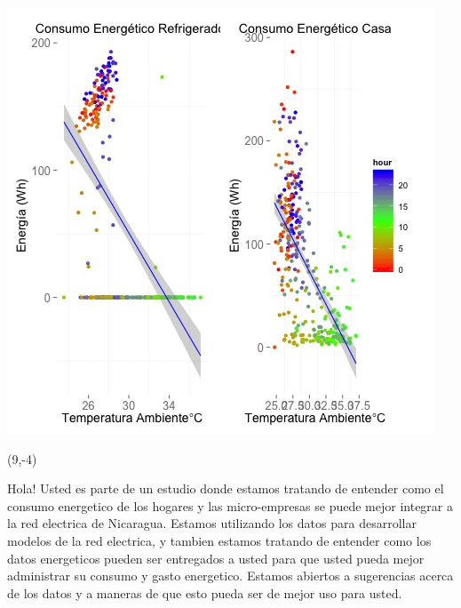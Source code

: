 \documentclass{article}\usepackage[]{graphicx}\usepackage[]{color}
\newenvironment{knitrout}{}{} %
\begin{document}
\begin{knitrout}
\color{fgcolor}
\includegraphics[scale=0.75]{figure/A12_correlaciones} 
\end{knitrout}

 \begin{textblock}{1}(9,-4)
\begin{minipage}{20em}
\begingroup

\endgroup
\end{minipage}
\end{textblock}

\vspace{70px}
\begin{knitrout}
Hola! Usted es parte de un estudio donde estamos tratando de entender como el consumo energetico de los hogares y las micro-empresas se puede mejor integrar a la red electrica de Nicaragua. Estamos utilizando los datos para desarrollar modelos de la red electrica, y tambien estamos tratando de entender como los datos energeticos pueden ser entregados a usted para que usted pueda mejor administrar su consumo y gasto energetico.  Estamos abiertos a sugerencias acerca de los datos y a maneras de que esto pueda ser de mejor uso para usted.
\end{knitrout}
\end{document}

